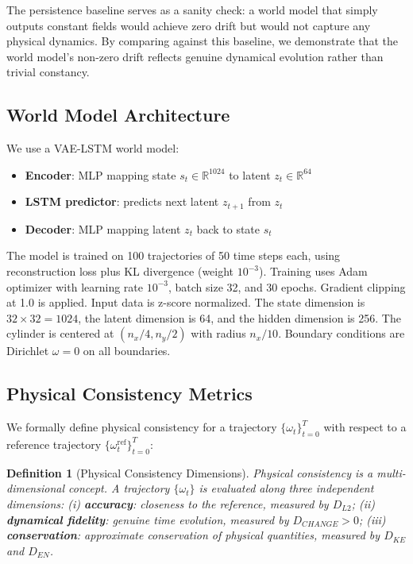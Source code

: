 \documentclass[reprint,aps,pre]{revtex4-2}
\newtheorem{definition}{Definition}
\begin{document}
The persistence baseline serves as a sanity check: a world model that simply outputs constant fields would achieve zero drift but would not capture any physical dynamics. By comparing against this baseline, we demonstrate that the world model's non-zero drift reflects genuine dynamical evolution rather than trivial constancy.

\subsection{World Model Architecture}

We use a VAE-LSTM world model:
\begin{itemize}
\item \textbf{Encoder}: MLP mapping state $s_t \in \mathbb{R}^{1024}$ to latent $z_t \in \mathbb{R}^{64}$
\item \textbf{LSTM predictor}: predicts next latent $z_{t+1}$ from $z_t$
\item \textbf{Decoder}: MLP mapping latent $z_t$ back to state $s_t$
\end{itemize}

The model is trained on 100 trajectories of 50 time steps each, using reconstruction loss plus KL divergence (weight $10^{-3}$). Training uses Adam optimizer with learning rate $10^{-3}$, batch size 32, and 30 epochs. Gradient clipping at 1.0 is applied. Input data is z-score normalized. The state dimension is $32\times32=1024$, the latent dimension is 64, and the hidden dimension is 256. The cylinder is centered at $(n_x/4, n_y/2)$ with radius $n_x/10$. Boundary conditions are Dirichlet $\omega = 0$ on all boundaries.

\subsection{Physical Consistency Metrics}

We formally define physical consistency for a trajectory $\{\omega_t\}_{t=0}^{T}$ with respect to a reference trajectory $\{\omega_t^{\text{ref}}\}_{t=0}^{T}$:

\begin{definition}[Physical Consistency Dimensions]
Physical consistency is a \textit{multi-dimensional} concept. A trajectory $\{\omega_t\}$ is evaluated along three independent dimensions: (i) \textbf{accuracy}: closeness to the reference, measured by $D_{L2}$; (ii) \textbf{dynamical fidelity}: genuine time evolution, measured by $D_{CHANGE} > 0$; (iii) \textbf{conservation}: approximate conservation of physical quantities, measured by $D_{KE}$ and $D_{EN}$.
\end{definition}
\end{document}

